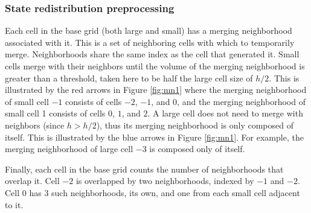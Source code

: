 \subsubsection*{State redistribution preprocessing}
Each cell in the base grid (both large and small) has a merging neighborhood
associated with it.
This is  a set of neighboring cells with which to temporarily merge.
Neighborhoods share the same index as the cell that generated it.
Small cells merge with their neighbors until the volume of the merging neighborhood is greater than
a threshold, taken here to be half the large cell size of $h/2$.
This is illustrated by the red arrows in Figure \ref{fig:mn1} where the merging neighborhood of 
small cell $-1$ consists of cells $-2$, $-1$, and $0$, and the merging neighborhood of 
small cell 1 consists of cells $0$, $1$, and $2$. 
A large cell does not need to merge with neighbors (since $h > h/2$), thus its merging neighborhood is only 
composed of itself.  This is illustrated by the blue arrows in Figure
\ref{fig:mn1}. For example,  the 
merging neighborhood of large cell $-3$ is composed only of itself.

Finally, each cell in the base grid counts the number of neighborhoods that overlap it. 
Cell $-2$ is overlapped by two neighborhoods, indexed by $-1$ and $-2$.
Cell 0 has 3 such neighborhoods, its own, and one from each small cell adjacent to it.

